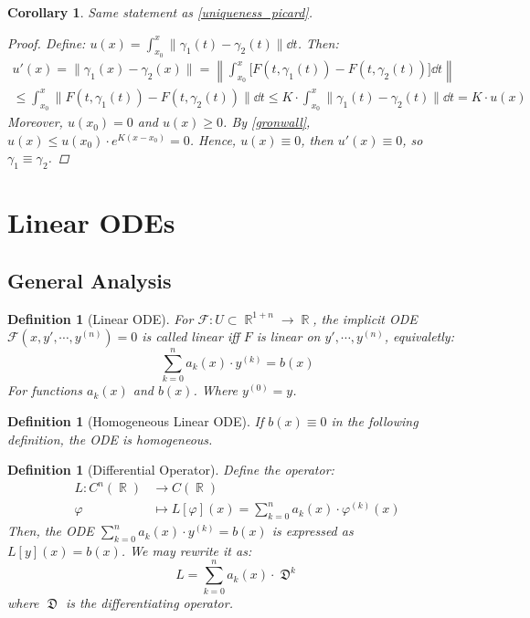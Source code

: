 \documentclass[12pt]{article}
\DeclareMathOperator{\R}{\mathbb{R}}
\DeclareMathOperator{\D}{\mathfrak{D}}
\newcommand{\der}[2][n]{{#2}^{(#1)}}
\newtheorem{definition}[theorem]{Definition}
\newtheorem{corollary}[theorem]{Corollary}
\begin{document}
\begin{corollary}
  Same statement as \ref{uniqueness_picard}.
  \begin{proof}
    Define: $\displaystyle u(x)=\int_{x_0}^x\big\|\gamma_1(t)-\gamma_2(t)\big\|\dd{t}$. Then:
    \begin{align*}
      u'(x)=\|\gamma_1(x)-\gamma_2(x)\|=\left\|\int_{x_0}^x\big[F(t,\gamma_1(t))-F(t,\gamma_2(t))\big]\dd{t}\right\|\\\leq \int_{x_0}^x\big\|F(t,\gamma_1(t))-F(t,\gamma_2(t))\big\|\dd{t}\leq K\cdot \int_{x_0}^x\big\|\gamma_1(t)-\gamma_2(t)\big\|\dd{t}=K\cdot u(x)
    \end{align*}
    Moreover, $u(x_0)=0$ and $u(x)\geq 0$. By \ref{gronwall}, $u(x)\leq u(x_0)\cdot e^{K(x-x_0)}=0$. Hence, $u(x)\equiv 0$, then $u'(x)\equiv 0$, so $\gamma_1\equiv \gamma_2$.
  \end{proof}
\end{corollary}

\pagebreak

\section{Linear ODEs}

\subsection{General Analysis}

\begin{definition}[Linear ODE]
  For $\mathcal{F}:U\subset\R^{1+n}\to \R$, the implicit ODE $\mathcal{F}(x,y',\cdots,\der{y})=0$ is called linear iff $F$ is linear on $y',\cdots,\der{y}$, equivaletly: $$\sum_{k=0}^n a_k(x)\cdot\der[k]{y}=b(x)$$
  For functions $a_k(x)$ and $b(x)$. Where $\der[0]{y}=y$.
\end{definition}

\begin{definition}[Homogeneous Linear ODE]
  If $b(x)\equiv 0$ in the following definition, the ODE is homogeneous. 
\end{definition}

\begin{definition}[Differential Operator]
Define the operator: $$\begin{aligned}L:C^n(\R)&\to C(\R)\\
\varphi&\mapsto L[\varphi](x)=\sum_{k=0}^n a_k(x)\cdot\der[k]{\varphi}(x)\end{aligned}$$ Then, the ODE $\sum_{k=0}^n a_k(x)\cdot\der[k]{y}=b(x)$ is expressed as $L[y](x)=b(x)$. We may rewrite it as: $$L=\sum_{k=0}^n a_k(x)\cdot \D^k$$ where $\D$ is the differentiating operator.
\end{definition}
\end{document}
